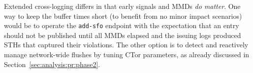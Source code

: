 Extended cross-logging differs in that early signals and MMDs \emph{do matter}.
One way to keep the buffer times short (to benefit from no minor impact
scenarios) would be to operate the \texttt{add-sfo} endpoint with the
expectation that an entry should not be published until all MMDs elapsed
and the issuing logs produced STHs that captured their violations.  The other
option is to detect and reactively manage network-wide flushes by tuning CTor
parameters, as already discussed in Section~\ref{sec:analysis:pr:phase2}.
